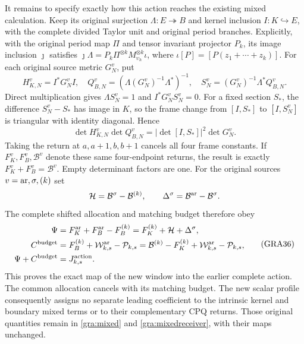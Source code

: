 \documentclass[11pt,a4paper]{article}
\begin{document}
It remains to specify exactly how this action reaches the existing mixed
calculation.  Keep its original surjection $\Lambda:E\twoheadrightarrow B$
and kernel inclusion $I:K\hookrightarrow E$, with the complete divided
Taylor unit and original period branches.  Explicitly, with the original
period map $\Pi$ and tensor invariant projector $P_k$, its image inclusion
$\jmath$ satisfies
$\jmath\Lambda=P_k\Pi^{\otimes k}M_{\upsilon_h}^{\otimes k}\iota$,
where $\iota[P]=[P(z_1+\cdots+z_k)]$.  For each original source metric
$G_N^v$, put
\[
 H_{K,N}^v=I^*G_N^vI,\quad
 Q_{B,N}^v=(\Lambda(G_N^v)^{-1}\Lambda^*)^{-1},\quad
 S_N^v=(G_N^v)^{-1}\Lambda^*Q_{B,N}^v.
\]
Direct multiplication gives $\Lambda S_N^v=1$ and
$I^*G_N^vS_N^v=0$.  For a fixed section $S_*$, the difference
$S_N^v-S_*$ has image in $K$, so the frame change from $[I,S_*]$ to
$[I,S_N^v]$ is triangular with identity diagonal.  Hence
\[
 \det H_{K,N}^v\det Q_{B,N}^v=|\det[I,S_*]|^2\det G_N^v.
\]
Taking the return at $a,a+1,b,b+1$ cancels all four frame constants.
If $F_K^v,F_B^v,\mathcal B^v$ denote these same four-endpoint returns,
the result is exactly $F_K^v+F_B^v=\mathcal B^v$.  Empty determinant
factors are one.  For the original sources $v={\rm ar},\sigma,(k)$ set
\[
 \mathcal H=\mathcal B^\sigma-\mathcal B^{(k)},\qquad
 \Delta^\sigma=\mathcal B^{\rm ar}-\mathcal B^\sigma.
\]
The complete shifted allocation and matching budget therefore obey
\begin{equation}
 \begin{aligned}
 \Psi&=F_K^{\rm ar}+F_B^{\rm ar}-F_B^{(k)}
       =F_K^{(k)}+\mathcal H+\Delta^\sigma,\\
 C^{\rm budget}&=F_B^{(k)}+\mathcal W_{k,s}^{\rm ar}-\mathcal P_{k,s}
       =\mathcal B^{(k)}-F_K^{(k)}
          +\mathcal W_{k,s}^{\rm ar}-\mathcal P_{k,s},\\
 \Psi+C^{\rm budget}&=J_{k,s}^{\rm action}.
 \end{aligned}\tag{GRA36}\label{gra:mixedreceiver}
\end{equation}
This proves the exact map of the new window into the earlier complete
action.  The common allocation cancels with its matching budget.  The
new scalar profile consequently assigns no separate leading coefficient
to the intrinsic kernel and boundary mixed terms or to their
complementary CPQ returns.  Those original quantities remain in
\eqref{gra:mixed} and \eqref{gra:mixedreceiver}, with their maps unchanged.

\label{GRBUILD:ARITHMETIC_GROWING_RATIO_BODY:end}
\end{document}
